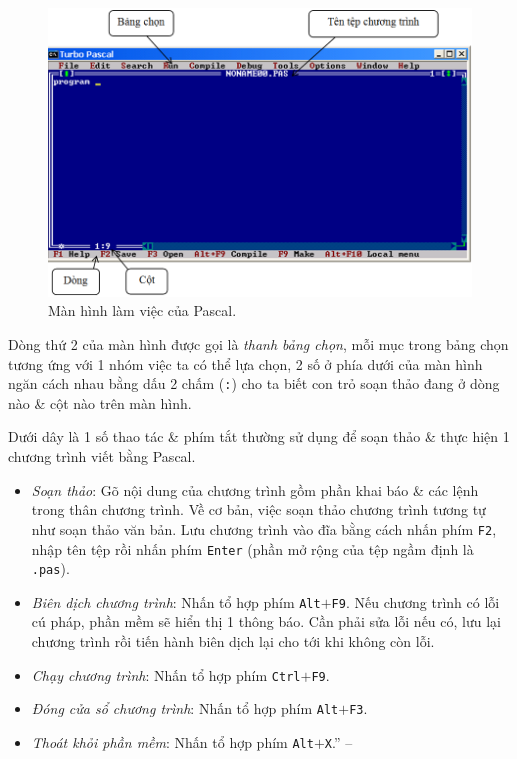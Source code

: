\documentclass[oneside]{book}
\numberwithin{equation}{section}
\begin{document}
\begin{figure}[H]
	\centering
	\includegraphics[scale=0.5]{Turbo_Pascal_interface}
	\caption{Màn hình làm việc của Pascal.}
	\label{fig:Turbo Pascal interface}
\end{figure}
Dòng thứ 2 của màn hình được gọi là \textit{thanh bảng chọn}, mỗi mục trong bảng chọn tương ứng với 1 nhóm việc ta có thể lựa chọn, 2 số ở phía dưới của màn hình ngăn cách nhau bằng dấu 2 chấm (\texttt{:}) cho ta biết con trỏ soạn thảo đang ở dòng nào \& cột nào trên màn hình.

Dưới dây là 1 số thao tác \& phím tắt thường sử dụng để soạn thảo \& thực hiện 1 chương trình viết bằng Pascal.
\begin{itemize}
	\item \textit{Soạn thảo}: Gõ nội dung của chương trình gồm phần khai báo \& các lệnh trong thân chương trình. Về cơ bản, việc soạn thảo chương trình tương tự như soạn thảo văn bản. Lưu chương trình vào đĩa bằng cách nhấn phím \texttt{F2}, nhập tên tệp rồi nhấn phím \texttt{Enter} (phần mở rộng của tệp ngầm định là \texttt{.pas}).
	\item \textit{Biên dịch chương trình}: Nhấn tổ hợp phím \texttt{Alt}$+$\texttt{F9}. Nếu chương trình có lỗi cú pháp, phần mềm sẽ hiển thị 1 thông báo. Cần phải sửa lỗi nếu có, lưu lại chương trình rồi tiến hành biên dịch lại cho tới khi không còn lỗi.
	\item \textit{Chạy chương trình}: Nhấn tổ hợp phím \texttt{Ctrl}$+$\texttt{F9}.
	\item \textit{Đóng cửa sổ chương trình}: Nhấn tổ hợp phím \texttt{Alt}$+$\texttt{F3}.
	\item \textit{Thoát khỏi phần mềm}: Nhấn tổ hợp phím \texttt{Alt}$+$\texttt{X}.'' -- \cite[pp. 32--33]{SGK_Tin_Hoc_11}
\end{itemize}
\end{document}
